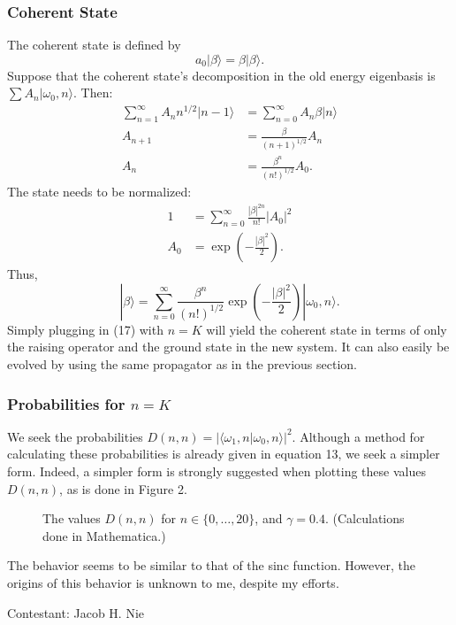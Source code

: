 \documentclass[12pt]{article}
\begin{document}
\subsubsection*{Coherent State}
The coherent state is defined by
\[
	a_0|\beta\rangle  = \beta |\beta\rangle .
\] 
Suppose that the coherent state's decomposition in the old energy eigenbasis is $\sum A_n |\omega_0,n\rangle $.  Then:
\begin{align*}
	\sum_{n=1}^{\infty} A_n n^{1/2} |n-1\rangle &= \sum_{n=0}^{\infty} A_n \beta |n\rangle \\
	A_{n+1} &= \frac{\beta}{(n+1)^{1/2}} A_n \\
	A_n &= \frac{\beta^{n}}{(n!)^{1/2}} A_0.
\end{align*}
The state needs to be normalized:
\begin{align*}
	1 &= \sum_{n=0}^{\infty} \frac{|\beta|^{2n}}{n!}|A_0|^2  \\
	A_0 &= \exp\left( -\frac{|\beta|^2}{2} \right).
\end{align*}
Thus,
\begin{equation}
	|\beta\rangle  = \sum_{n=0}^{\infty} \frac{\beta^n}{(n!)^{1/2}}\exp\left( -\frac{|\beta|^2}{2} \right) |\omega_0,n\rangle .
\end{equation}
Simply plugging in (17) with $n = K$ will yield the coherent state in terms of only the raising operator and the ground state in the new system.  It can also easily be evolved by using the same propagator as in the previous section. 


\subsubsection*{Probabilities for $n = K$ }
We seek the probabilities $D(n,n) = |\langle \omega_1,n|\omega_0,n\rangle |^2$.  Although a method for calculating these probabilities is already given in equation 13, we seek a simpler form.  Indeed, a simpler form is strongly suggested when plotting these values $D(n,n)$, as is done in Figure 2. 

\begin{figure}[ht]
	\centering
	\caption{The values $D(n,n)$ for $n \in \{0, \ldots, 20\}$, and $\gamma =0.4$.  (Calculations done in Mathematica.)}
\end{figure}

The behavior seems to be similar to that of the sinc function.  However, the origins of this behavior is unknown to me, despite my efforts.

\vspace{1cm}

\hfill Contestant: Jacob H. Nie
\end{document}
